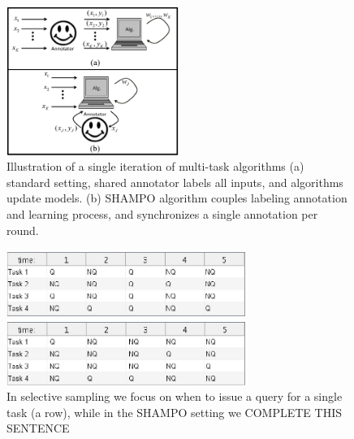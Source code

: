 \begin{figure}
\begin{centering}
\includegraphics[width=0.5\textwidth]{figs/SHAMPO_illustration.eps}
\caption{Illustration of a single iteration of  multi-task algorithms (a) standard setting, shared annotator labels all inputs, and algorithms update models. (b) SHAMPO algorithm couples labeling annotation and learning process, and synchronizes a single annotation per round.}
\label{fig:ilustration}
\end{centering}
\end{figure}

\begin{figure}
\begin{centering}
\includegraphics[width=0.7\textwidth]{figs/table_ss.eps}
\end{centering} 
\begin{centering}
\includegraphics[width=0.7\textwidth]{figs/table_SHAMPO.eps}
\caption{In selective sampling we focus on when to issue a query for a single task (a row), while in the SHAMPO setting we
   COMPLETE THIS SENTENCE  }
\label{fig:ss_vs_SHAMPO}
\end{centering}
\end{figure}

